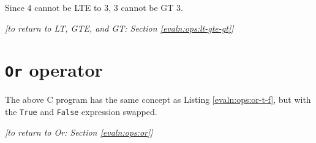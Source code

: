     
    Since 4 cannot be LTE to 3, 3 cannot be GT 3.
    \\
    
    \begin{flushright}
        \textit{[to return to LT, GTE, and GT: Section \ref{evaln:ops:lt-gte-gt}]}
    \end{flushright}

\newpage


\section{\texttt{Or} operator}\label{app:evaln:ops:or}
    
    
    The above C program has the same concept as Listing \ref{evaln:ops:or-t-f}, but with the \texttt{True} and \texttt{False} expression swapped.
    \\
    
    \begin{flushright}
        \textit{[to return to Or: Section \ref{evaln:ops:or}]}
    \end{flushright}

